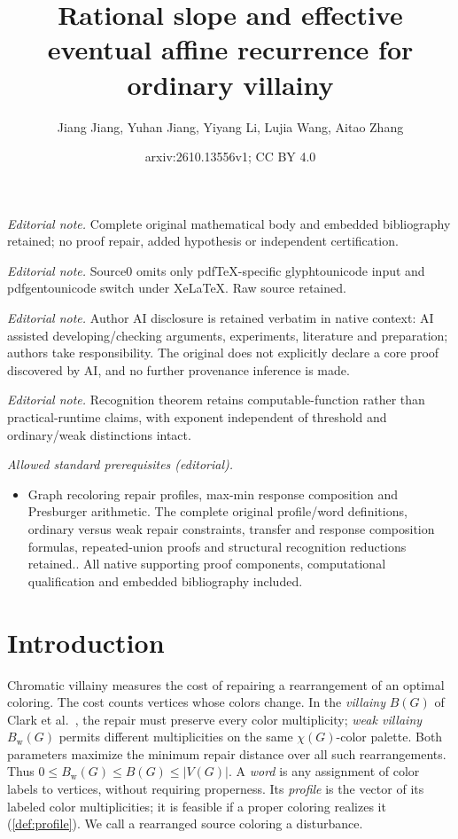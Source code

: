 \documentclass[10pt,a4paper]{amsart}
\title{Rational slope and effective eventual affine recurrence for ordinary villainy}
\author{Jiang Jiang, Yuhan Jiang, Yiyang Li, Lujia Wang, Aitao Zhang}
\date{arxiv:2610.13556v1; CC BY 4.0}
\numberwithin{equation}{section}
\theoremstyle{definition}
\theoremstyle{remark}
\begin{document}
\maketitle
\noindent\textit{Editorial note.} Complete original mathematical body and embedded bibliography retained; no proof repair, added hypothesis or independent certification.\par\medskip
\noindent\textit{Editorial note.} Source0 omits only pdfTeX-specific glyphtounicode input and pdfgentounicode switch under XeLaTeX. Raw source retained.\par\medskip
\noindent\textit{Editorial note.} Author AI disclosure is retained verbatim in native context: AI assisted developing/checking arguments, experiments, literature and preparation; authors take responsibility. The original does not explicitly declare a core proof discovered by AI, and no further provenance inference is made.\par\medskip
\noindent\textit{Editorial note.} Recognition theorem retains computable-function rather than practical-runtime claims, with exponent independent of threshold and ordinary/weak distinctions intact.\par\medskip
\noindent\textit{Allowed standard prerequisites (editorial).}\begin{itemize}
\item Graph recoloring repair profiles, max-min response composition and Presburger arithmetic. The complete original profile/word definitions, ordinary versus weak repair constraints, transfer and response composition formulas, repeated-union proofs and structural recognition reductions retained.. All native supporting proof components, computational qualification and embedded bibliography included.
\end{itemize}\medskip
\section{Introduction}

Chromatic villainy measures the cost of repairing a rearrangement of
an optimal coloring. The cost counts vertices whose colors change.
In the \emph{villainy} $B(G)$ of Clark et al.~\cite{clark2006},
the repair must preserve every color multiplicity; \emph{weak
villainy} $B_{\mathrm w}(G)$ permits different multiplicities on the
same $\chi(G)$-color palette. Both parameters maximize the minimum
repair distance over all such rearrangements. Thus
$0\le B_{\mathrm w}(G)\le B(G)\le |V(G)|$.
A \emph{word} is any assignment of color labels to vertices, without
requiring properness. Its \emph{profile} is the vector of its labeled color
multiplicities; it is feasible if a proper coloring realizes it
(\cref{def:profile}). We call a rearranged source coloring a disturbance.
\end{document}
